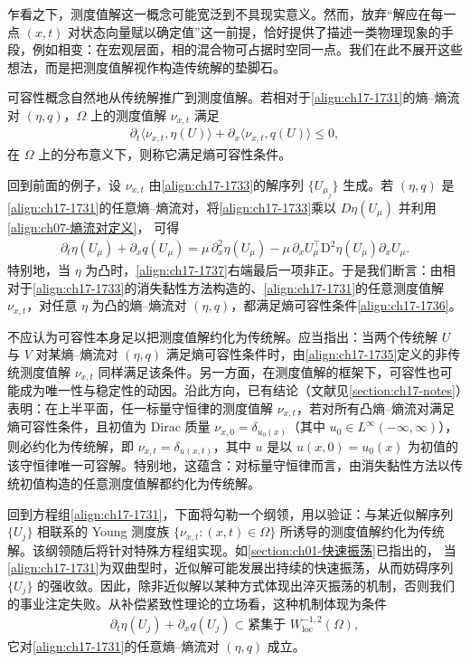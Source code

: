 \documentclass[../../main.tex]{subfiles}
\begin{document}
乍看之下，测度值解这一概念可能宽泛到不具现实意义。然而，放弃“解应在每一点 $(x,t)$ 对状态向量赋以确定值”这一前提，恰好提供了描述一类物理现象的手段，例如相变：在宏观层面，相的混合物可占据时空同一点。我们在此不展开这些想法，而是把测度值解视作构造传统解的垫脚石。

可容性概念自然地从传统解推广到测度值解。若相对于\eqref{align:ch17-1731}的熵--熵流对 $(\eta,q)$，$\Omega$ 上的测度值解 $\nu_{x,t}$ 满足
\begin{align}
\partial_t\langle\nu_{x,t},\eta(U)\rangle+\partial_x\langle\nu_{x,t},q(U)\rangle\leqslant 0,
\label{align:ch17-1736}
\end{align}
在 $\Omega$ 上的分布意义下，则称它满足熵可容性条件。

回到前面的例子，设 $\nu_{x,t}$ 由\eqref{align:ch17-1733}的解序列 $\{U_{\mu_j}\}$ 生成。若 $(\eta,q)$ 是\eqref{align:ch17-1731}的任意熵--熵流对，将\eqref{align:ch17-1733}乘以 $D\eta(U_\mu)$ 并利用\eqref{align:ch07-熵流对定义}，
可得
\begin{align}
\partial_t\eta(U_\mu)+\partial_x q(U_\mu)=\mu\,\partial_x^2\eta(U_\mu)-\mu\,\partial_xU_\mu^{\top}\mathrm{D}^2\eta(U_\mu)\partial_xU_\mu.
\label{align:ch17-1737}
\end{align}
特别地，当 $\eta$ 为凸时，\eqref{align:ch17-1737}右端最后一项非正。于是我们断言：由相对于\eqref{align:ch17-1733}的消失黏性方法构造的、\eqref{align:ch17-1731}的任意测度值解 $\nu_{x,t}$，对任意 $\eta$ 为凸的熵--熵流对 $(\eta,q)$，都满足熵可容性条件\eqref{align:ch17-1736}。

不应认为可容性本身足以把测度值解约化为传统解。应当指出：当两个传统解 $U$ 与 $V$ 对某熵--熵流对 $(\eta,q)$ 满足熵可容性条件时，由\eqref{align:ch17-1735}定义的非传统测度值解 $\nu_{x,t}$ 同样满足该条件。另一方面，在测度值解的框架下，可容性也可能成为唯一性与稳定性的动因。沿此方向，已有结论（文献见\cref{section:ch17-notes}）表明：在上半平面，任一标量守恒律的测度值解 $\nu_{x,t}$，若对所有凸熵--熵流对满足熵可容性条件，且初值为 Dirac 质量 $\nu_{x,0}=\delta_{u_0(x)}$（其中 $u_0\in L^\infty(-\infty,\infty)$），则必约化为传统解，即 $\nu_{x,t}=\delta_{u(x,t)}$，其中 $u$ 是以 $u(x,0)=u_0(x)$ 为初值的该守恒律唯一可容解。特别地，这蕴含：对标量守恒律而言，由消失黏性方法以传统初值构造的任意测度值解都约化为传统解。

回到方程组\eqref{align:ch17-1731}，下面将勾勒一个纲领，用以验证：与某近似解序列 $\{U_j\}$ 相联系的 Young 测度族 $\{\nu_{x,t}:(x,t)\in\Omega\}$ 所诱导的测度值解约化为传统解。该纲领随后将针对特殊方程组实现。如\cref{section:ch01-快速振荡}已指出的，
当\eqref{align:ch17-1731}为双曲型时，近似解可能发展出持续的快速振荡，从而妨碍序列 $\{U_j\}$ 的强收敛。因此，除非近似解以某种方式体现出淬灭振荡的机制，否则我们的事业注定失败。从补偿紧致性理论的立场看，这种机制体现为条件
\begin{align}
\partial_t\eta(U_j)+\partial_x q(U_j)\subset\text{紧集于 }W^{-1,2}_{\mathrm{loc}}(\Omega),
\label{align:ch17-1738}
\end{align}
它对\eqref{align:ch17-1731}的任意熵--熵流对 $(\eta,q)$ 成立。
\end{document}
